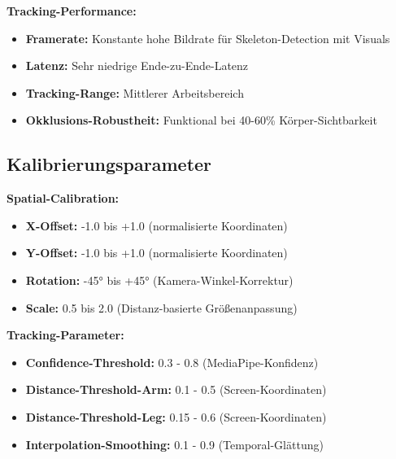 \textbf{Tracking-Performance:}
\begin{itemize}
    \item \textbf{Framerate:} Konstante hohe Bildrate für Skeleton-Detection mit Visuals
    \item \textbf{Latenz:} Sehr niedrige Ende-zu-Ende-Latenz
    \item \textbf{Tracking-Range:} Mittlerer Arbeitsbereich
    \item \textbf{Okklusions-Robustheit:} Funktional bei 40-60\% Körper-Sichtbarkeit
\end{itemize}

\subsection{Kalibrierungsparameter}

\textbf{Spatial-Calibration:}
\begin{itemize}
    \item \textbf{X-Offset:} -1.0 bis +1.0 (normalisierte Koordinaten)
    \item \textbf{Y-Offset:} -1.0 bis +1.0 (normalisierte Koordinaten)
    \item \textbf{Rotation:} -45° bis +45° (Kamera-Winkel-Korrektur)
    \item \textbf{Scale:} 0.5 bis 2.0 (Distanz-basierte Größenanpassung)
\end{itemize}

\textbf{Tracking-Parameter:}
\begin{itemize}
    \item \textbf{Confidence-Threshold:} 0.3 - 0.8 (MediaPipe-Konfidenz)
    \item \textbf{Distance-Threshold-Arm:} 0.1 - 0.5 (Screen-Koordinaten)
    \item \textbf{Distance-Threshold-Leg:} 0.15 - 0.6 (Screen-Koordinaten)
    \item \textbf{Interpolation-Smoothing:} 0.1 - 0.9 (Temporal-Glättung)
\end{itemize}